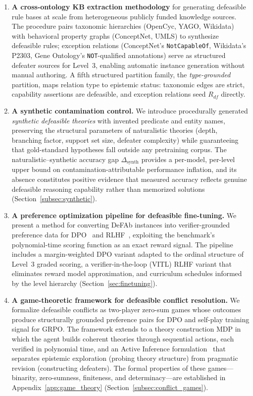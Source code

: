 \documentclass{article}
\theoremstyle{definition}
\newcommand{\Rdf}{R_{df}}
\begin{document}
\begin{enumerate}[label=(\arabic*),nosep]
    \item \textbf{A cross-ontology KB extraction methodology} for generating defeasible rule bases at scale from heterogeneous publicly funded knowledge sources. The procedure pairs taxonomic hierarchies (OpenCyc, YAGO, Wikidata) with behavioral property graphs (ConceptNet, UMLS) to synthesize defeasible rules; exception relations (ConceptNet's \texttt{NotCapableOf}, Wikidata's P2303, Gene Ontology's \texttt{NOT}-qualified annotations) serve as structured defeater sources for Level~3, enabling automatic instance generation without manual authoring. A fifth structured partition family, the \emph{type-grounded} partition, maps relation type to epistemic status: taxonomic edges are strict, capability assertions are defeasible, and exception relations seed $\Rdf$ directly.

    \item \textbf{A synthetic contamination control.} We introduce procedurally generated \emph{synthetic defeasible theories} with invented predicate and entity names, preserving the structural parameters of naturalistic theories (depth, branching factor, support set size, defeater complexity) while guaranteeing that gold-standard hypotheses fall outside any pretraining corpus. The naturalistic--synthetic accuracy gap $\Delta_{\mathrm{synth}}$ provides a per-model, per-level upper bound on contamination-attributable performance inflation, and its absence constitutes positive evidence that measured accuracy reflects genuine defeasible reasoning capability rather than memorized solutions (Section~\ref{subsec:synthetic}).

    \item \textbf{A preference optimization pipeline for defeasible fine-tuning.} We present a method for converting DeFAb instances into verifier-grounded preference data for DPO~\cite{rafailov2023direct} and RLHF~\cite{ouyang2022training}, exploiting the benchmark's polynomial-time scoring function as an exact reward signal. The pipeline includes a margin-weighted DPO variant adapted to the ordinal structure of Level~3 graded scoring, a verifier-in-the-loop (VITL) RLHF variant that eliminates reward model approximation, and curriculum schedules informed by the level hierarchy (Section~\ref{sec:finetuning}).

    \item \textbf{A game-theoretic framework for defeasible conflict resolution.} We formalize defeasible conflicts as two-player zero-sum games whose outcomes produce structurally grounded preference pairs for DPO and self-play training signal for GRPO. The framework extends to a theory construction MDP in which the agent builds coherent theories through sequential actions, each verified in polynomial time, and an Active Inference formulation~\cite{parr2022active} that separates epistemic exploration (probing theory structure) from pragmatic revision (constructing defeaters). The formal properties of these games---binarity, zero-sumness, finiteness, and determinacy---are established in Appendix~\ref{app:game_theory} (Section~\ref{subsec:conflict_games}).


\end{enumerate}
\end{document}
